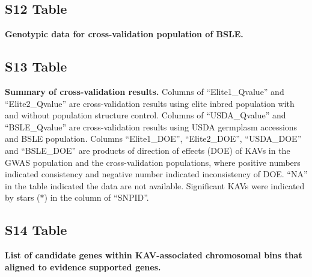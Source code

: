 \documentclass[10pt,letterpaper]{article}
\begin{document}
\subsection*{S12 Table}
\label{Table_S12}
{\bf Genotypic data for cross-validation population of BSLE.}

\subsection*{S13 Table}
\label{Table_S13}
{\bf Summary of cross-validation results.} 
Columns of “Elite1\_Qvalue” and “Elite2\_Qvalue” are cross-validation results using elite inbred population with and without population structure control. Columns of “USDA\_Qvalue” and “BSLE\_Qvalue” are cross-validation results using USDA germplasm accessions and BSLE population. Columns “Elite1\_DOE”, “Elite2\_DOE”, “USDA\_DOE” and “BSLE\_DOE” are products of direction of effects (DOE) of KAVs in the GWAS population and the cross-validation populations, where positive numbers indicated consistency and negative number indicated inconsistency of DOE. “NA” in the table indicated the data are not available. Significant KAVs were indicated by stars ($\ast$) in the column of “SNPID”.

\subsection*{S14 Table}
\label{Table_S14}
{\bf List of candidate genes within KAV-associated chromosomal bins that aligned to evidence supported genes.}
\end{document}
